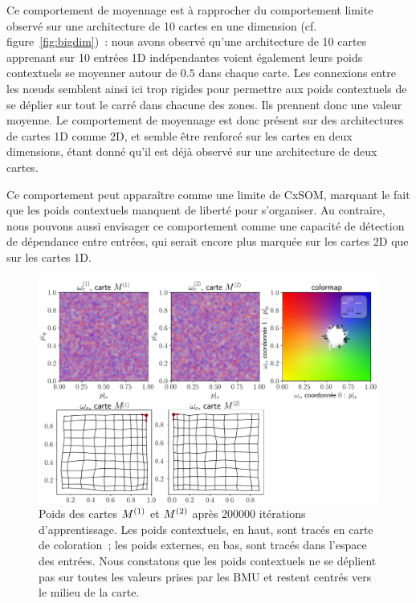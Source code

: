 \documentclass[../main]{subfiles}
\begin{document}
Ce comportement de moyennage est à rapprocher du comportement limite observé sur une architecture de 10 cartes en une dimension (cf. figure~\ref{fig:bigdim})~: nous avons observé qu'une architecture de 10 cartes apprenant sur 10 entrées 1D indépendantes voient également leurs poids contextuels se moyenner autour de $0.5$ dans chaque carte.
Les connexions entre les n\oe{}uds semblent ainsi ici trop rigides pour permettre aux poids contextuels de se déplier sur tout le carré dans chacune des zones. Ils prennent donc une valeur moyenne.
Le comportement de moyennage est donc présent sur des architectures de cartes 1D comme 2D, et semble être renforcé sur les cartes en deux dimensions, étant donné qu'il est déjà observé sur une architecture de deux cartes.

Ce comportement peut apparaître comme une limite de CxSOM, marquant le fait que les poids contextuels manquent de liberté pour s'organiser. Au contraire, nous pouvons aussi envisager ce comportement comme une capacité de détection de dépendance entre entrées, qui serait encore plus marquée sur les cartes 2D que sur les cartes 1D. 

\begin{figure}
	\centering\includegraphics[width=\textwidth]{w_cub_rc002.pdf}
	\caption{Poids des cartes $M^{({1})}$ et $M^{({2})}$ après 200000 itérations d'apprentissage. Les poids contextuels, en haut, sont tracés en carte de coloration~; les poids externes, en bas, sont tracés dans l'espace des entrées.
	Nous constatons que les poids contextuels ne se déplient pas sur toutes les valeurs prises par les BMU et restent centrés vers le milieu de la carte. \label{fig:2som_cub_wc}}
\end{figure}
\end{document}
